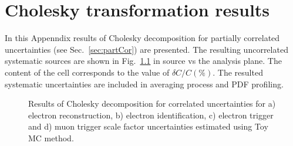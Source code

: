 \chapter{Cholesky transformation results}\label{app:Chol}
In this Appenndix results of Cholesky decomposition for partially correlated uncertainties (see Sec.~\ref{sec:partCor}) are presented. The resulting uncorrelated systematic sources are shown in Fig.~\ref{fig:AppA} in source vs the analysis plane. The content of the cell corresponds to the value of $\delta C/C (\%)$.  The resulted systematic uncertainties are included in averaging process and PDF profiling.

\begin{figure}[!h]
\begin{minipage}[h]{0.39\linewidth}
\end{minipage}
\hfill
\begin{minipage}[h]{0.39\linewidth}
\end{minipage}
\vfill
\begin{minipage}[h]{0.39\linewidth}
\end{minipage}
\hfill
\begin{minipage}[h]{0.39\linewidth}
\end{minipage}
\caption{Results of Cholesky decomposition for correlated uncertainties for a) electron reconstruction, b) electron identification, c) electron trigger and d) muon trigger scale factor uncertainties estimated using Toy MC method.}
\label{fig:AppA}
\end{figure}